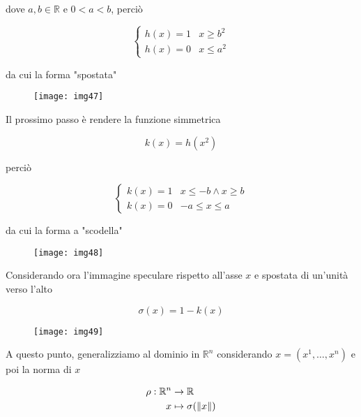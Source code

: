 dove $ a,b \in \mathbb{R} $ e $ 0 < a < b $, perciò

\begin{equation}
	\begin{cases}
		h(x) = 1 & x \geqslant b^{2}\\
		h(x) = 0 & x \leqslant a^{2}
	\end{cases}
\end{equation}

da cui la forma "spostata"

\begin{figure}[H]
	\centering
	\texttt{[image: img47]}
\end{figure}

Il prossimo passo è rendere la funzione simmetrica

\begin{equation}
	k(x) = h(x^{2})
\end{equation}

perciò

\begin{equation}
	\begin{cases}
		k(x) = 1 & x \leqslant -b \wedge x \geqslant b\\
		k(x) = 0 & -a \leqslant x \leqslant a
	\end{cases}
\end{equation}

da cui la forma a "scodella"

\begin{figure}[H]
	\centering
	\texttt{[image: img48]}
\end{figure}

Considerando ora l'immagine speculare rispetto all'asse $ x $ e spostata di un'unità verso l'alto

\begin{equation}
	\sigma(x) = 1 - k(x)
\end{equation}

\begin{figure}[H]
	\centering
	\texttt{[image: img49]}
\end{figure}

A questo punto, generalizziamo al dominio in $ \mathbb{R}^{n} $ considerando $ x = (x^{1},\dots,x^{n}) $ e poi la norma di $ x $

\begin{align}
	\begin{split}
		\rho : \mathbb{R}^{n} &\to \mathbb{R}\\
		x &\mapsto \sigma(\norm{x})
	\end{split}
\end{align}

